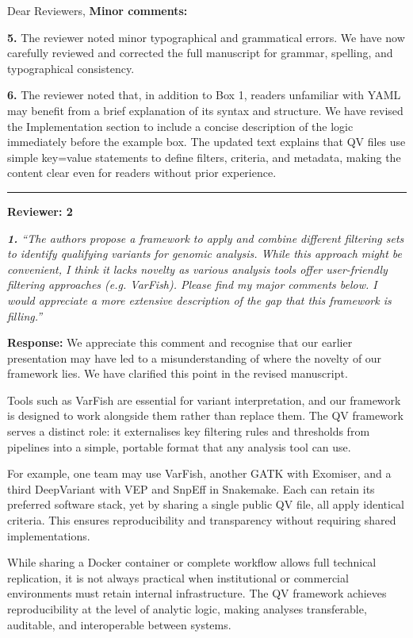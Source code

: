 \documentclass[12pt,a4paper]{letter}
\begin{document}
\begin{letter}{Dear Reviewers,}
\textbf{Minor comments:}

\textbf{5.} The reviewer noted minor typographical and grammatical errors. We have now carefully reviewed and corrected the full manuscript for grammar, spelling, and typographical consistency.

\textbf{6.} The reviewer noted that, in addition to Box 1, readers unfamiliar with YAML may benefit from a brief explanation of its syntax and structure. We have revised the Implementation section to include a concise description of the logic immediately before the example box. The updated text explains that QV files use simple key=value statements to define filters, criteria, and metadata, making the content clear even for readers without prior experience.

\noindent\rule{\textwidth}{0.4pt}

\textbf{Reviewer: 2}
%

\textit{\textbf{1.} ``The authors propose a framework to apply and combine different filtering sets to identify qualifying variants for genomic analysis. While this approach might be convenient, I think it lacks novelty as various analysis tools offer user-friendly filtering approaches (e.g. VarFish). Please find my major comments below. I would appreciate a more extensive description of the gap that this framework is filling.''}

\textbf{Response:} We appreciate this comment and recognise that our earlier presentation may have led to a misunderstanding of where the novelty of our framework lies. We have clarified this point in the revised manuscript.

Tools such as VarFish are essential for variant interpretation, and our framework is designed to work alongside them rather than replace them. The QV framework serves a distinct role: it externalises key filtering rules and thresholds from pipelines into a simple, portable format that any analysis tool can use.

For example, one team may use VarFish, another GATK with Exomiser, and a third DeepVariant with VEP and SnpEff in Snakemake. Each can retain its preferred software stack, yet by sharing a single public QV file, all apply identical criteria. This ensures reproducibility and transparency without requiring shared implementations.

While sharing a Docker container or complete workflow allows full technical replication, it is not always practical when institutional or commercial environments must retain internal infrastructure. The QV framework achieves reproducibility at the level of analytic logic, making analyses transferable, auditable, and interoperable between systems.


\end{letter}
\end{document}
